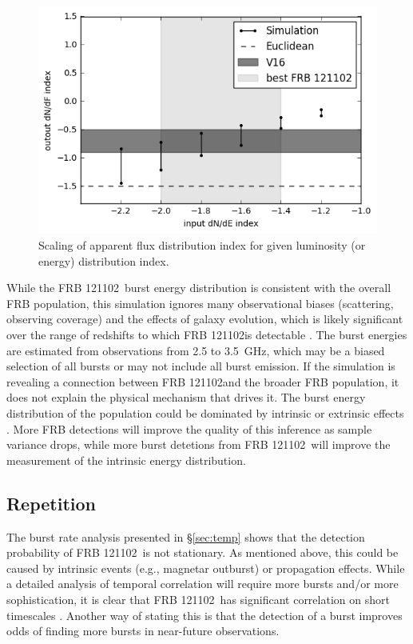 \documentclass[twocolumn]{aastex61}
\newcommand{\frb}{FRB 121102}
\begin{document}
\begin{figure}[htb]
\begin{center}
\includegraphics[width=0.9\columnwidth]{sim_index_scaling}
\caption{Scaling of apparent flux distribution index for given luminosity (or energy) distribution index.
\label{fig:ind}}
\end{center}
\end{figure}

While the \frb\ burst energy distribution is consistent with the overall FRB population, this simulation ignores many observational biases (scattering, observing coverage) and the effects of galaxy evolution, which is likely significant over the range of redshifts to which \frb is detectable \citep[e.g.,][]{2010ApJ...709..644I}. The burst energies are estimated from observations from 2.5 to 3.5~GHz, which may be a biased selection of all bursts or may not include all burst emission. If the simulation is revealing a connection between \frb and the broader FRB population, it does not explain the physical mechanism that drives it. The burst energy distribution of the population could be dominated by intrinsic or extrinsic effects \citep{2015MNRAS.451.3278M,2016Natur.531..202S,CORDES}. More FRB detections will improve the quality of this inference as sample variance drops, while more burst detetions from \frb\ will improve the measurement of the intrinsic energy distribution.

\subsection{Repetition}
The burst rate analysis presented in \S \ref{sec:temp} shows that the detection probability of \frb\ is not stationary. As mentioned above, this could be caused by intrinsic events (e.g., magnetar outburst) or propagation effects. While a detailed analysis of temporal correlation will require more bursts and/or more sophistication, it is clear that \frb\ has significant correlation on short timescales \citep[sometimes called a ``red spectrum'';][]{2016MNRAS.458L..89C}. Another way of stating this is that the detection of a burst improves odds of finding more bursts in near-future observations. 
\end{document}
